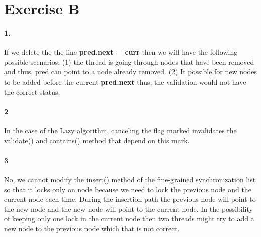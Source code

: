 \section*{Exercise B}
\paragraph{1.}
If we delete the the line \textbf{pred.next = curr} then we will have
the following possible scenarios: (1) the thread is going through
nodes that have been removed and thus, pred can point to a node
already removed. (2) It possible for new nodes to be added before the
current \textbf{pred.next} thus, the validation would not have the
correct status.

\paragraph{2}
In the case of the Lazy algorithm, canceling the flag marked
invalidates the validate() and contains() method that depend on this
mark.

\paragraph{3}
No, we cannot modify the insert() method of the fine-grained
synchronization list so that it locks only on node because we need to
lock the previous node and the current node each time. During the
insertion path the previous node will point to the new node and the
new node will point to the current node. In the possibility of keeping
only one lock in the current node then two threads might try to add a
new node to the previous node which that is not correct. 
